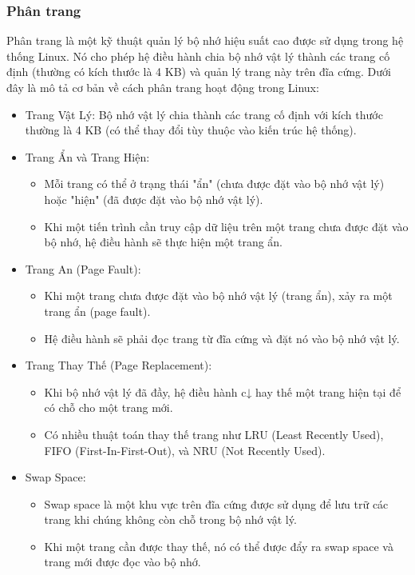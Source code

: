 \documentclass[12pt,a4paper]{article}
\begin{document}
\subsubsection{Phân trang}
Phân trang là một kỹ thuật quản lý bộ nhớ hiệu suất cao được sử dụng trong hệ thống Linux. Nó cho phép hệ điều hành chia bộ nhớ vật lý thành các trang cố định (thường có kích thước là 4 KB) và quản lý trang này trên đĩa cứng. Dưới đây là mô tả cơ bản về cách phân trang hoạt động trong Linux:
\begin{itemize}
	\item Trang Vật Lý: Bộ nhớ vật lý chia thành các trang cố định với kích thước thường là 4 KB (có thể thay đổi tùy thuộc vào kiến trúc hệ thống).
	\item Trang Ẩn và Trang Hiện:
	\begin{itemize}
		\item Mỗi trang có thể ở trạng thái "ẩn" (chưa được đặt vào bộ nhớ vật lý) hoặc "hiện" (đã được đặt vào bộ nhớ vật lý).
		\item Khi một tiến trình cần truy cập dữ liệu trên một trang chưa được đặt vào bộ nhớ, hệ điều hành sẽ thực hiện một trang ẩn.
	\end{itemize}
	\item Trang An (Page Fault):
	\begin{itemize}
		\item Khi một trang chưa được đặt vào bộ nhớ vật lý (trang ẩn), xảy ra một trang ẩn (page fault).
		\item Hệ điều hành sẽ phải đọc trang từ đĩa cứng và đặt nó vào bộ nhớ vật lý.
	\end{itemize}
	\item Trang Thay Thế (Page Replacement):
	\begin{itemize}
		\item Khi bộ nhớ vật lý đã đầy, hệ điều hành c↓ hay thế một trang hiện tại để có chỗ cho một trang mới.
		\item Có nhiều thuật toán thay thế trang như LRU (Least Recently Used), FIFO (First-In-First-Out), và NRU (Not Recently Used).
	\end{itemize}
	\item Swap Space:
	\begin{itemize}
		\item Swap space là một khu vực trên đĩa cứng được sử dụng để lưu trữ các trang khi chúng không còn chỗ trong bộ nhớ vật lý.
		\item Khi một trang cần được thay thế, nó có thể được đẩy ra swap space và trang mới được đọc vào bộ nhớ.

\end{itemize}
\end{itemize}
\end{document}

